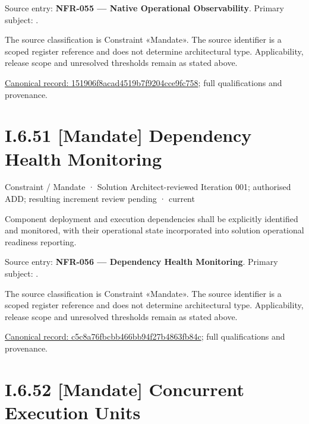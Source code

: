 Source entry: \textbf{NFR-055 — Native Operational Observability}. Primary subject: \texttt{}.



The source classification is Constraint «Mandate». The source identifier is a scoped register reference and does not determine architectural type. Applicability, release scope and unresolved thresholds remain as stated above.


{\footnotesize \href{../../../../continuum/motivation/constraint/mandate/151906f8acad4519b7f9204cce9fc758.md}{Canonical record: 151906f8acad4519b7f9204cce9fc758}; full qualifications and provenance.}\par
\section*{I.6.51 [Mandate] Dependency Health Monitoring}
\label{navigation:I.6.51}

\label{element:c5c8a76fbcbb466bb94f27b4863fb84c}
{\small Constraint / Mandate · Solution Architect-reviewed Iteration 001; authorised ADD; resulting increment review pending · current}\par

Component deployment and execution dependencies shall be explicitly identified and monitored, with their operational state incorporated into solution operational readiness reporting.



Source entry: \textbf{NFR-056 — Dependency Health Monitoring}. Primary subject: \texttt{}.



The source classification is Constraint «Mandate». The source identifier is a scoped register reference and does not determine architectural type. Applicability, release scope and unresolved thresholds remain as stated above.


{\footnotesize \href{../../../../continuum/motivation/constraint/mandate/c5c8a76fbcbb466bb94f27b4863fb84c.md}{Canonical record: c5c8a76fbcbb466bb94f27b4863fb84c}; full qualifications and provenance.}\par
\section*{I.6.52 [Mandate] Concurrent Execution Units}
\label{navigation:I.6.52}

